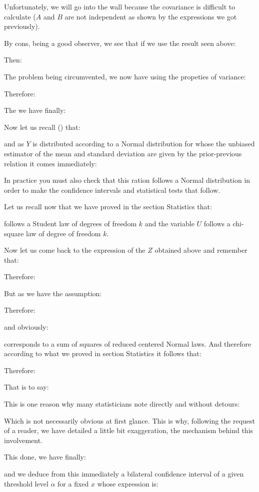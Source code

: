 	Unfortunately, we will go into the wall because the covariance is difficult to calculate ($A$ and $B$ are not independent as shown by the expressions we got previously).
	
	By cons, being a good observer, we see that if we use the result seen above:
	
	Then:
	
	The problem being circumvented, we now have using the propeties of variance:
	
	Therefore:
	
	The we have finally:
	
	Now let us recall () that:
	
	and as $Y$ is distributed according to a Normal distribution for whose the unbiased estimator of the mean and standard deviation are given by the prior-previous  relation it comes immediately:
	
	In practice you must also check that this ration follows a Normal distribution in order to make the confidence intervals and statistical tests that follow.
	
	Let us recall now that we have proved in the section Statistics that:
	
	follows a Student law of degrees of freedom $k$ and the variable $U$ follows a chi-square law of degree of freedom $k$.
	
	Now let us come back to the expression of the $Z$ obtained above and remember that:
	
	Therefore:
	
	But as we have the assumption:
	
	Therefore:
	
	and obviously:
	
	corresponds to a sum of squares of reduced centered Normal laws. And therefore according to what we proved in section Statistics it follows that:
	
	Therefore:
	
	That is to say:
	
	This is one reason why many statisticians note directly and without detours:
	
	
	Which is not necessarily obvious at first glance. This is why, following the request of a reader, we have detailed a little bit exaggeration, the mechanism behind this involvement.
	
	This done, we have finally:
	
	and we deduce from this immediately a bilateral confidence interval of a given threshold level $\alpha$ for a fixed $x$ whose expression is:
	

